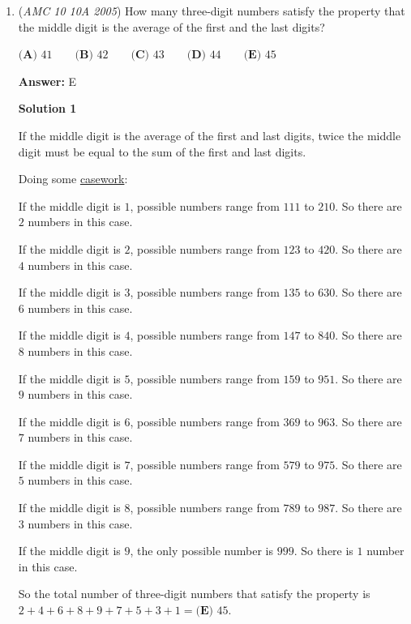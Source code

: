 \begin{enumerate}
 Hence the solution is $4 < n < 130$, and therefore the answer is the number of positive integers in the open interval $(4,130)$, which is $129-5+1 = \boxed{\textbf{(E) } 125}$.

 


	\item (\textit{AMC 10 10A 2005}) How many three-digit numbers satisfy the property that the middle digit is the average of the first and the last digits? 


 $\textbf{(A) } 41\qquad \textbf{(B) } 42\qquad \textbf{(C) } 43\qquad \textbf{(D) } 44\qquad \textbf{(E) } 45$

 \textbf{Answer: }E



\textbf{Solution 1}

If the middle digit is the average of the first and last digits, twice the middle digit must be equal to the sum of the first and last digits. 

 Doing some \href{https://artofproblemsolving.com/wiki/index.php?title=Casework}{casework}: 

 If the middle digit is $1$, possible numbers range from $111$ to $210$. So there are $2$ numbers in this case. 

 If the middle digit is $2$, possible numbers range from $123$ to $420$. So there are $4$ numbers in this case. 

 If the middle digit is $3$, possible numbers range from $135$ to $630$. So there are $6$ numbers in this case. 

 If the middle digit is $4$, possible numbers range from $147$ to $840$. So there are $8$ numbers in this case. 

 If the middle digit is $5$, possible numbers range from $159$ to $951$. So there are $9$ numbers in this case. 

 If the middle digit is $6$, possible numbers range from $369$ to $963$. So there are $7$ numbers in this case. 

 If the middle digit is $7$, possible numbers range from $579$ to $975$. So there are $5$ numbers in this case. 

 If the middle digit is $8$, possible numbers range from $789$ to $987$. So there are $3$ numbers in this case. 

 If the middle digit is $9$, the only possible number is $999$. So there is $1$ number in this case. 

 So the total number of three-digit numbers that satisfy the property is $2+4+6+8+9+7+5+3+1=\boxed{\textbf{(E) } 45}$.


\end{enumerate}
